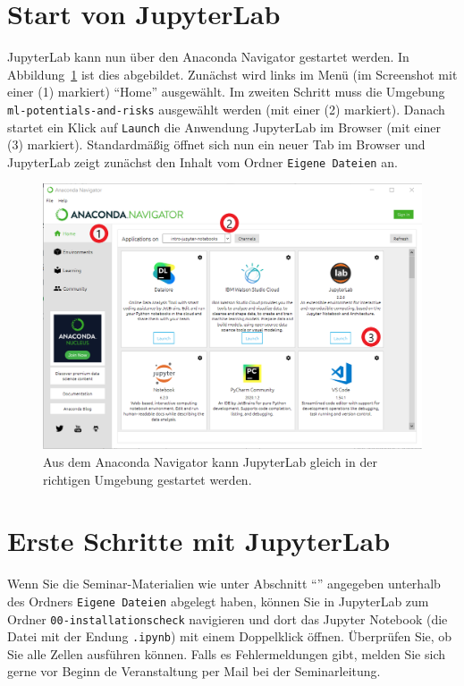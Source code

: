 \documentclass{tufte-handout}
\begin{document}
\section{Start von JupyterLab}

JupyterLab kann nun über den Anaconda Navigator gestartet werden.
In Abbildung~\ref{fig:start-jupyterlab} ist dies abgebildet.
Zunächst wird links im Menü
(im Screenshot mit einer (1) markiert)
\enquote{Home} ausgewählt.
Im zweiten Schritt muss die Umgebung
\texttt{ml-potentials-and-risks}
ausgewählt werden
(mit einer (2) markiert).
Danach startet ein Klick auf \texttt{Launch} die Anwendung JupyterLab im Browser
(mit einer (3) markiert).
Standardmäßig öffnet sich nun ein neuer Tab im Browser und JupyterLab zeigt zunächst den Inhalt vom Ordner \texttt{Eigene Dateien} an.

\begin{figure}[h]
  \includegraphics{anaconda-navigator-jupyterlab--mit-reihenfolge}
  \caption{Aus dem Anaconda Navigator kann JupyterLab gleich in der richtigen Umgebung gestartet werden.}%
\label{fig:start-jupyterlab}
\end{figure}

\section{Erste Schritte mit JupyterLab}

Wenn Sie die Seminar-Materialien wie unter Abschnitt \enquote{} angegeben unterhalb des Ordners \texttt{Eigene Dateien} abgelegt haben, 
können Sie in JupyterLab zum Ordner 
\texttt{00-installationscheck}
navigieren und dort das Jupyter Notebook (die Datei mit der Endung \texttt{.ipynb}) mit einem Doppelklick öffnen.
Überprüfen Sie, ob Sie alle Zellen ausführen können.
Falls es Fehlermeldungen gibt, melden Sie sich gerne vor Beginn de Veranstaltung per Mail bei der Seminarleitung.
\end{document}
